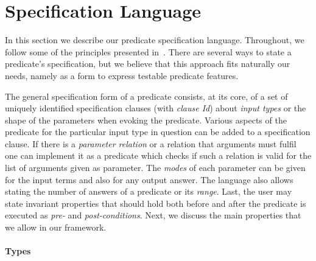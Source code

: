 
\section{Specification Language}
\label{sec:pred-spec}

In this section we describe our predicate specification language.
%
Throughout, we follow some of the principles presented
in~\cite{Deville1990logprog}.
%
There are several ways to state a predicate's specification, %
but we
 believe that this approach fits naturally our needs, namely as a
form to express testable predicate features. %


The general specification form of a predicate  consists, at its
core, of a set of uniquely identified specification clauses
 (with \emph{clause Id})
 about \emph{input types} or the shape of the parameters when evoking the predicate.
%
%
Various aspects of the predicate for the particular input type in
question can be added to a specification clause.
%
If there is
a \emph{parameter relation} or
 a relation that arguments must fulfil one can implement it
as a predicate%
which checks if such a relation is
valid for the list of arguments given as parameter.
%
The \emph{modes} of each parameter can be given for the input terms and also
for any output answer.
%
The language also allows stating the number of
answers of a predicate
or its \emph{range}.
%
Last, the user may state invariant properties that should hold both
before and after the predicate is executed as \emph{pre-} and \emph{post-conditions}.
%
Next, we discuss the main properties that we allow in our framework.

\paragraph{\bf Types}

